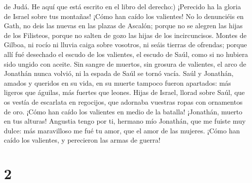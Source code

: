 de Judá. He aquí que está escrito en el libro del derecho:)
 ¡Perecido ha la gloria de Israel sobre tus montañas! ¡Cómo
han caído los valientes!  No lo denunciéis en Gath, no deis
las nuevas en las plazas de Ascalón; porque no se alegren las hijas de
los Filisteos, porque no salten de gozo las hijas de los incircuncisos.
 Montes de Gilboa, ni rocío ni lluvia caiga sobre vosotros,
ni seáis tierras de ofrendas; porque allí fué desechado el escudo de los
valientes, el escudo de Saúl, como si no hubiera sido ungido con aceite.
 Sin sangre de muertos, sin grosura de valientes, el arco
de Jonathán nunca volvió, ni la espada de Saúl se tornó vacía.
 Saúl y Jonathán, amados y queridos en su vida, en su
muerte tampoco fueron apartados: más ligeros que águilas, más fuertes
que leones.  Hijas de Israel, llorad sobre Saúl, que os
vestía de escarlata en regocijos, que adornaba vuestras ropas con
ornamentos de oro.  ¡Cómo han caído los valientes en medio
de la batalla! ¡Jonathán, muerto en tus alturas!  Angustia
tengo por ti, hermano mío Jonathán, que me fuiste muy dulce: más
maravilloso me fué tu amor, que el amor de las mujeres. 
¡Cómo han caído los valientes, y perecieron las armas de guerra!

\hypertarget{section-1}{%
\section{2}\label{section-1}}

